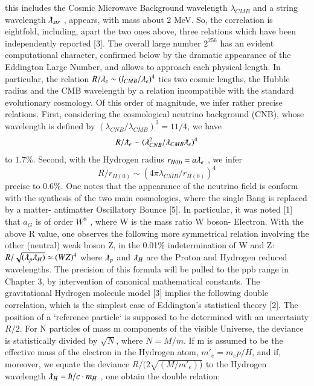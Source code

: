 \documentclass[twoside,draft]{article}
\begin{document}
\begin{sloppypar}
{$$$$
this includes the Cosmic Microwave Background wavelength $\lambda_{CMB}$ and a string wavelength $\lambdabar_{str}$ , appears, with mass about 2 MeV.  So, the correlation is eightfold,
including, apart the two ones above, three relations which have been independently reported [3].
The overall large number $2^{256}$ has an evident computational character, confirmed below by the
dramatic appearance of the Eddington Large Number, and allows to approach each physical length.
In particular, the relation $R/\lambdabar_{e} \sim (l_{CMB} / \lambdabar_{e})^{4}$ ties two cosmic lengths, the Hubble radius and the CMB wavelength by a relation incompatible with the standard evolutionary cosmology. Of this order of
magnitude, we infer rather precise relations. First, considering the cosmological neutrino
background (CNB), whose wavelength is defined by $(\lambda_{CNB} / \lambda_{CMB})^{3} = 11/4$, we have $$R/ \lambdabar_{e} \sim
( \lambda_{CNB}^{2} / \lambda_{CMB} \lambdabar_{e} )^{4}$$ to $1.7\%$. Second, with the Hydrogen radius $r_{H(0)} = a\lambdabar_{e}$ , we infer 
\begin{equation}
R/r_{H(0)} \sim (4\pi \lambda_{CMB} /r_{H(0)} )^{4}
\end{equation}
precise to $0.6\%$. One notes that the appearance of the neutrino field is conform
with the synthesis of the two main cosmologies, where the single Bang is replaced by a matter-
antimatter Oscillatory Bounce [5].
In particular, it was noted [1] that $a_{G}$ is of order $W^{8}$ , where W is the mass ratio W boson-
Electron. With the above R value, one observes the following more symmetrical relation involving
the other (neutral) weak boson Z, in the 0.01\% indetermination of W and Z:
$R/\sqrt{(\lambdabar_{p} \lambdabar_{H})} \approx (WZ)^4$
where $\lambdabar_{p}$ and $\lambdabar_{H}$ are the Proton and Hydrogen reduced wavelengths. The precision of this formula
will be pulled to the ppb range in Chapter 3, by intervention of canonical mathematical constants.
The gravitational Hydrogen molecule model [3] implies the following double correlation,
which is the simplest case of Eddington's statistical theory [2]. The position of a `reference particle`
is supposed to be determined with an uncertainty ${R/2}$. For N particles of mass m components of the visible Universe, the deviance is statistically divided by $\sqrt{N}$, where $N = M/m$. If m is assumed to be
the effective mass of the electron in the Hydrogen atom, $m\prime_{e} = m_{e} p/H$, and if, moreover, we equate
the deviance $R/(2\sqrt{(M/m\prime_{e}))}$ to the Hydrogen wavelength $\lambdabar_{H} = \hbar/c \cdot m_{H}$ , one obtain the double relation:
}
\end{sloppypar}
\end{document}
